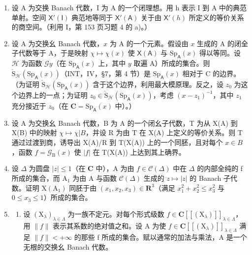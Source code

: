 \begin{enumerate}
\def\labelenumi{\arabic{enumi})}
\setcounter{enumi}{16}
\item
  设 A 为交换 Banach 代数，I 为 A 的一个闭理想。用 h 表示 I 到 A 中的典范单射。空间 \(\mathsf{X}'(\mathsf{I})\) 典范地等同于 \(\mathsf{X}'(\mathsf{A})\) 关于由 \(\mathsf{X}'(h)\) 所定义的等价关系的商空间。（利用 I，第 153 页习题 4 的 a)。）
\item
  设 A 为交换幺 Banach 代数，\(x\) 为 A 的一个元素。假设由 \(x\) 生成的 A 的闭全子代数等于 A，于是映射 \(\chi \mapsto \chi(x)\) 使 \(\mathsf{X}(\mathsf{A})\) 与 \(\mathrm{Sp}_{\mathsf{A}}(x)\) 得以等同。设 \(\mathcal{H}\) 为函数 \(\mathcal{G}y\)（在 \(\mathrm{Sp}_{\mathsf{A}}(x)\) 上，其中 \(y\) 取遍 A）所成的集合。则 \(\check{\mathrm{S}}_{\mathcal{H}}(\mathrm{Sp}_{\mathsf{A}}(x))\)（INT，IV，§7，第 4 节）是 \(\mathrm{Sp}_{\mathsf{A}}(x)\) 相对于 C 的边界。（为证明 \(\check{\mathrm{S}}_{\mathcal{H}}(\mathrm{Sp}_{\mathsf{A}}(x))\) 含于这个边界，利用最大模原理。反之，设 \(z_0\) 为这个边界上的一点；为证明 \(z_0 \in \check{\mathrm{S}}_{\mathcal{H}}(\mathrm{Sp}_{\mathsf{A}}(x))\)，考虑 \((x - z_1)^{-1}\)，其中 \(z_1\) 充分接近于 \(z_0\)（在 \(\mathbf{C} = \mathrm{Sp}_{\mathsf{A}}(x)\) 中）。）
\item
  设 A 为交换幺 Banach 代数，B 为 A 的一个闭幺子代数，T 为从 X(A) 到 X(B) 中的映射 \(\chi \mapsto \chi|B\)，并设 R 为由 T 在 X(A) 上定义的等价关系。则 T 通过过渡到商，诱导出 X(A)/R 到 T(X(A)) 上的一个同胚，且对每个 \(x \in B\)，函数 \(f = \mathcal{G}_{\mathrm{B}}(x)\) 使 \(|f|\) 在 T(X(A)) 上达到其上确界。
\item
  设 \(\Delta\) 为圆盘 \(|z| \leqslant 1\)（在 \(\mathbf{C}\) 中），A 为由 \(f \in \mathcal{C}(\Delta)\) 中在 \(\Delta\) 的内部全纯的 f 所成的集合，而 \(\mathrm{A}_1\) 为由 A 与函数 \(\mathcal{C}(\Delta)\) 生成的 \(z \mapsto |z|\) 的 Banach 子代数。证明 \(\mathrm{X}(\mathrm{A}_1)\) 同胚于由 \((x_{1}, x_{2}, x_{3}) \in \mathbf{R}^{3}\)（满足 \(x_{1}^{2} + x_{2}^{2} \leqslant x_{3}^{2}\) 与 \(0 \leqslant x_{3} \leqslant 1\)）所成的集合。
\item
  \begin{enumerate}
  \def\labelenumii{\alph{enumii})}
  \tightlist
  \item
    设 \((\mathrm{X}_{\lambda})_{\lambda\in\Lambda}\) 为一族不定元。对每个形式级数 \(f\in\mathbf{C}[[(\mathrm{X}_{\lambda})]]_{\lambda\in\Lambda}\)，用 \(\|f\|\) 表示其系数的绝对值之和。设 A 为使 \(f\in\mathbf{C}[[(\mathrm{X}_{\lambda})]]_{\lambda\in\Lambda}\) 满足 \(\|f\|<+\infty\) 的那些 f 所成的集合。赋以通常的加法与乘法，A 是一个无根的交换幺 Banach 代数。
  \end{enumerate}
\end{enumerate}

